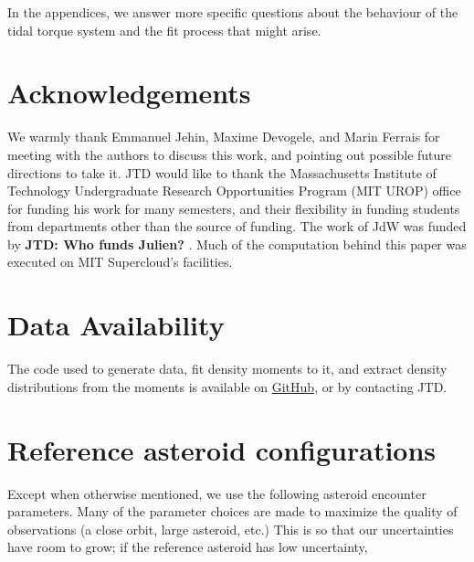 \documentclass[fleqn,usenatbib]{mnras}
\newcommand{\jtd}[1]{ {\bf{\color{red} JTD: #1}} }
\begin{document}
In the appendices, we answer more specific questions about the behaviour of the tidal torque system and the fit process that might arise.

\section*{Acknowledgements}

We warmly thank Emmanuel Jehin, Maxime Devogele, and Marin Ferrais for meeting with the authors to discuss this work, and pointing out possible future directions to take it. JTD would like to thank the Massachusetts Institute of Technology Undergraduate Research Opportunities Program (MIT UROP) office for funding his work for many semesters, and their flexibility in funding students from departments other than the source of funding. The work of JdW was funded by \jtd{Who funds Julien?}. Much of the computation behind this paper was executed on MIT Supercloud's facilities.



\section*{Data Availability}

The code used to generate data, fit density moments to it, and extract density distributions from the moments is available on \href{https://github.com/jack-dinsmore/asteroid-tidal-torque}{GitHub}, or by contacting JTD.









\appendix

\section{Reference asteroid configurations}
\label{app:reference-configs}

Except when otherwise mentioned, we use the following asteroid encounter parameters. Many of the parameter choices are made to maximize the quality of observations (a close orbit, large asteroid, etc.) This is so that our uncertainties have room to grow; if the reference asteroid has low uncertainty,
\end{document}
